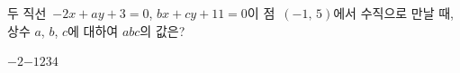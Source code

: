 두 직선~$-2x+ay+3=0$, $bx+cy+11=0$이 점~$(-1,\,5)$에서 수직으로 만날 때, 상수 $a$, $b$, $c$에 대하여 $abc$의 값은?
\begin{choices32}{$-2$}{$-1$}{$2$}{$3$}{$4$}\end{choices32}
